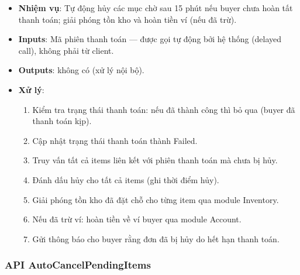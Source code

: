 \begin{itemize}[leftmargin=*]
  \item \textbf{Nhiệm vụ}: Tự động hủy các mục chờ sau 15 phút nếu buyer chưa hoàn tất thanh toán; giải phóng tồn kho và hoàn tiền ví (nếu đã trừ).
  \item \textbf{Inputs}: Mã phiên thanh toán --- được gọi tự động bởi hệ thống (delayed call), không phải từ client.
  \item \textbf{Outputs}: không có (xử lý nội bộ).
  \item \textbf{Xử lý}:
    \begin{enumerate}
      \item Kiểm tra trạng thái thanh toán: nếu đã thành công thì bỏ qua (buyer đã thanh toán kịp).
      \item Cập nhật trạng thái thanh toán thành Failed.
      \item Truy vấn tất cả items liên kết với phiên thanh toán mà chưa bị hủy.
      \item Đánh dấu hủy cho tất cả items (ghi thời điểm hủy).
      \item Giải phóng tồn kho đã đặt chỗ cho từng item qua module Inventory.
      \item Nếu đã trừ ví: hoàn tiền về ví buyer qua module Account.
      \item Gửi thông báo cho buyer rằng đơn đã bị hủy do hết hạn thanh toán.
    \end{enumerate}
\end{itemize}

\subsubsection{API AutoCancelPendingItems}

